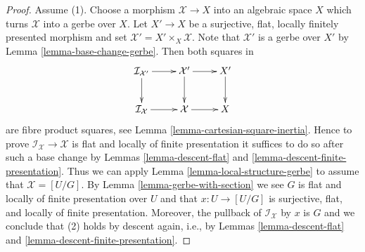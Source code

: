 \documentclass[10pt,a4paper]{amsart}
\theoremstyle{plain}
\theoremstyle{definition}
\theoremstyle{remark}
\numberwithin{equation}{subsection}
\begin{document}
\begin{proof}
Assume (1). Choose a morphism $\mathcal{X} \to X$ into an algebraic space $X$
which turns $\mathcal{X}$ into a gerbe over $X$. Let $X' \to X$ be a
surjective, flat, locally finitely presented morphism and
set $\mathcal{X}' = X' \times_X \mathcal{X}$. Note that $\mathcal{X}'$
is a gerbe over $X'$ by
Lemma \ref{lemma-base-change-gerbe}.
Then both squares in
$$
\xymatrix{
\mathcal{I}_{\mathcal{X}'} \ar[r] \ar[d] &
\mathcal{X}' \ar[r] \ar[d] & X' \ar[d] \\
\mathcal{I}_\mathcal{X} \ar[r] &
\mathcal{X} \ar[r] & X
}
$$
are fibre product squares, see
Lemma \ref{lemma-cartesian-square-inertia}.
Hence to prove $\mathcal{I}_\mathcal{X} \to \mathcal{X}$ is flat and
locally of finite presentation it suffices to do so after such a base
change by
Lemmas \ref{lemma-descent-flat} and
\ref{lemma-descent-finite-presentation}.
Thus we can apply
Lemma \ref{lemma-local-structure-gerbe}
to assume that $\mathcal{X} = [U/G]$.
By
Lemma \ref{lemma-gerbe-with-section}
we see $G$ is flat and locally of finite presentation over $U$ and
that $x : U \to [U/G]$ is surjective, flat, and locally of finite
presentation. Moreover, the pullback of $\mathcal{I}_\mathcal{X}$
by $x$ is $G$ and we conclude that (2) holds by descent again, i.e., by
Lemmas \ref{lemma-descent-flat} and
\ref{lemma-descent-finite-presentation}.


\end{proof}
\end{document}
